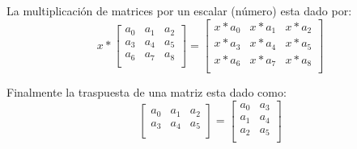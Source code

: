 La multiplicación de matrices por un escalar (número) esta dado por:
\begin{equation*}
    x*
    \left[
        \begin{array}{ccc}
            a_0 & a_1 & a_2 \\
            a_3 & a_4 & a_5 \\
            a_6 & a_7 & a_8 \\
        \end{array}
    \right]
    =
    \left[
        \begin{array}{ccc}
            x*a_0 & x*a_1 & x*a_2 \\
            x*a_3 & x*a_4 & x*a_5 \\
            x*a_6 & x*a_7 & x*a_8 \\
        \end{array}
    \right]
\end{equation*}

Finalmente la traspuesta de una matriz esta dado como:
\begin{equation*}
    \left[
        \begin{array}{ccc}
            a_0 & a_1 & a_2 \\
            a_3 & a_4 & a_5 \\
        \end{array}
    \right]
    =
    \left[
        \begin{array}{cc}
            a_0 & a_3 \\
            a_1 & a_4 \\
            a_2 & a_5 \\
        \end{array}
    \right]
\end{equation*}

